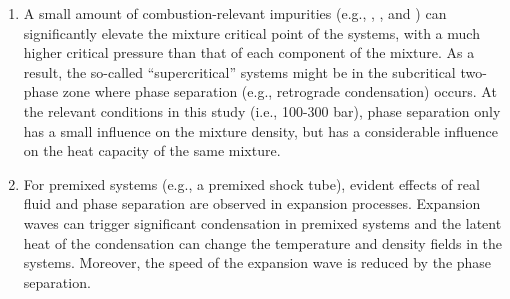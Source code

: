 
\begin{enumerate}
    \item A small amount of combustion-relevant impurities (e.g., , , and ) can significantly elevate the mixture critical point of the  systems, with a much higher critical pressure than that of each component of the mixture. As a result, the so-called ``supercritical''  systems might be in the subcritical two-phase zone where phase separation (e.g., retrograde condensation) occurs. %
    At the relevant conditions in this study (i.e., 100-300 bar), phase separation only has a small influence on the  mixture density, but has a considerable influence on the heat capacity of the same mixture.

    \item For premixed  systems (e.g., a premixed  shock tube), evident effects of real fluid and phase separation are observed in expansion processes. %
    Expansion waves can trigger significant condensation in premixed  systems and the latent heat of the condensation can change the temperature and density fields in the systems. Moreover, the speed of the expansion wave is reduced by the phase separation.


\end{enumerate}
